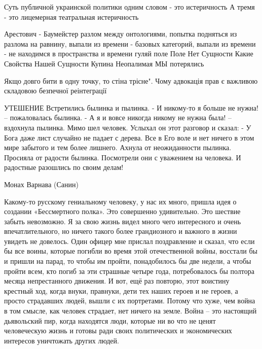 Суть публичной украинской политики одним словом - это истеричность
А тремя - это лицемерная театральная истеричность

Арестович - Баумейстер
	разлом между онтологиями, попытка подняться из разлома на равнину,
	выпали из времени - базовых категорий,
	выпали из времени - не находимся в пространства и времени
	гуляй поле Поле
	Нет Сущности
	Какие Свойства Нашей Сущности
	Купина Неопалимая
	МЫ потерялись

Якщо довго бити в одну точку, то стіна трісне". Чому адвокація прав є важливою складовою безпечної реінтеграції 

УТЕШЕНИЕ
 Встретились былинка и пылинка.
 - И никому-то я больше не нужна! – пожаловалась былинка.
 - А я и вовсе никогда никому не нужна была! – вздохнула пылинка.
 Мимо шел человек.
 Услыхал он этот разговор и сказал:
 - У Бога даже лист случайно не падает с дерева. Все в Его воле и нет ничего в этом мире забытого и тем более лишнего.
 Ахнула от неожиданности пылинка.
 Просияла от радости былинка.
 Посмотрели они с уважением на человека.
 И радостные разошлись по своим делам!

Монах Варнава (Санин)

Какому-то русскому гениальному человеку, у нас их много, пришла идея о создании
«Бессмертного полка». Это совершенно удивительно. Это шествие забыть
невозможно. Я за свою жизнь видел много чего интересного и очень
впечатлительного, но ничего такого более грандиозного и важного в жизни увидеть
не довелось. Один офицер мне прислал поздравление и сказал, что если бы все
воины, которые погибли во время этой отечественной войны, восстали бы и пришли
на парад, то чтобы им пройти, понадобилось бы две недели, а чтобы пройти всем,
кто погиб за эти страшные четыре года, потребовалось бы полтора месяца
непрестанного движения. И вот, ещё раз повторю, этот воистину крестный ход,
когда внуки, правнуки, дети тех наших героев и не героев, а просто страдавших
людей, вышли с их портретами. Потому что хуже, чем война в том смысле, как
человек страдает, нет ничего на земле. Война – это настоящий дьявольский пир,
когда находятся люди, которые ни во что не ценят человеческую жизнь и готовы
ради своих политических и экономических интересов уничтожать других людей. 
 
